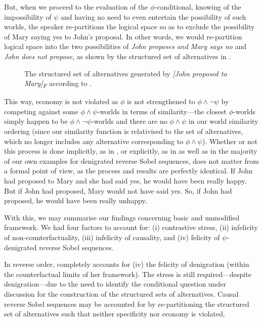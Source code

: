 But, when we proceed to the evaluation of the $\phi$-conditional, knowing of the impossibility of $\psi$ and having no need to even entertain the possibility of such worlds, the speaker re-partitions the logical space so as to exclude the possibility of Mary saying yes to John's proposal. In other words, we would re-partition logical space into the two possibilities of \textit{John proposes and Mary says no} and \textit{John does not propose}, as shown by the structured set of alternatives in .
\begin{figure}[!htb]
    \centering\hspace{-4cm}
    
    \caption{The structured set of alternatives generated by \textit{[John proposed to Mary]\textsubscript{F}} according to \textcite{Ippolito2020}.}
\end{figure}

This way, economy is not violated as $\phi$ is not strengthened to $\phi\land\neg\psi$ by competing against some $\phi\land\psi$-worlds in terms of similarity---the closest $\phi$-worlds simply happen to be $\phi\land\neg\psi$-worlds and there are no $\phi\land\psi$ in our world similarity ordering (since our similarity function is relativised to the set of alternatives, which no longer includes any alternative corresponding to $\phi\land\psi$). Whether or not this process is done implicitly, as in , or explicitly, as in  as well as in the majority of our own examples for denigrated reverse Sobel sequences, does not matter from a formal point of view, as the process and results are perfectly identical.
\pex[nopreamble=true]\label{ex:moss-explicit}%
\a{} If John had proposed to Mary and she had said yes, he would have been really happy.
\a{} But if John had proposed, Mary would not have said yes.
\a{} So, if John had proposed, he would have been really unhappy.\\\emptyfill\parencite[p. 663]{Ippolito2020}
\xe

With this, we may summarise our findings concerning  basic and unmodified framework. We had four factors to account for: (i) contrastive stress, (ii) infelicity of non-counterfactuality, (iii) infelicity of causality, and (iv) felicity of $\psi$-denigrated reverse Sobel sequences. 

In reverse order, \textcite{Ippolito2020} completely accounts for (iv) the felicity of denigration (within the counterfactual limits of her framework). The stress is still required---despite denigration---due to the need to identify the conditional question under discussion for the construction of the structured sets of alternatives. Causal reverse Sobel sequences may be accounted for by re-partitioning the structured set of alternatives such that neither specificity nor economy is violated.


